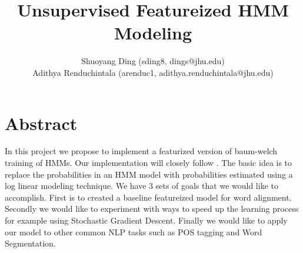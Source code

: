 \documentclass[11pt]{article}
\begin{document}
\title{Unsupervised Featureized HMM Modeling}

\author{Shuoyang Ding (sding8, dings@jhu.edu) \\ Adithya Renduchintala (arenduc1, adithya.renduchintala@jhu.edu)}


\maketitle

\section{Abstract}
In this project we propose to implement a featurized version of baum-welch training of HMMs. Our implementation will closely follow \cite{berg2010painless}. The basic idea is to replace the probabilities in an HMM model with probabilities estimated using a log linear modeling technique. We have 3 sets of goals that we would like to accomplish. First is to created a baseline featureized model for word alignment. Secondly we would like to experiment with ways to speed up the learning process for example using Stochastic Gradient Descent. Finally we would like to apply our model to other common NLP tasks such as POS tagging and Word Segmentation.
\end{document}
